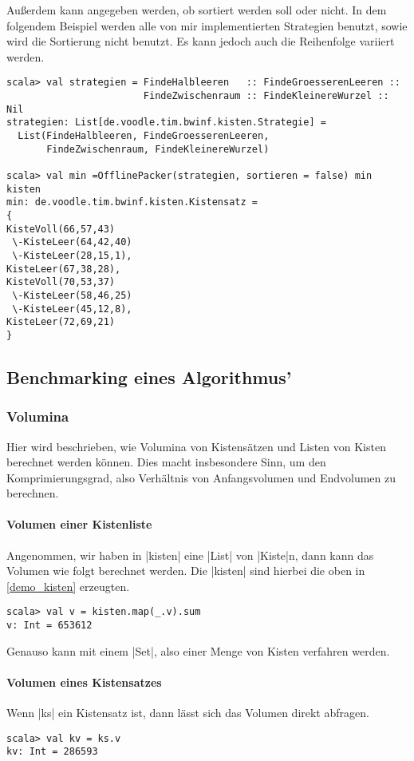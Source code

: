 Außerdem kann angegeben werden, ob sortiert werden soll oder nicht.
In dem folgendem Beispiel werden alle von mir implementierten Strategien benutzt, sowie wird die Sortierung nicht benutzt.
Es kann jedoch auch die Reihenfolge variiert werden.
\begin{lstlisting}
scala> val strategien = FindeHalbleeren   :: FindeGroesserenLeeren ::
                        FindeZwischenraum :: FindeKleinereWurzel :: Nil
strategien: List[de.voodle.tim.bwinf.kisten.Strategie] =
  List(FindeHalbleeren, FindeGroesserenLeeren,
       FindeZwischenraum, FindeKleinereWurzel)

scala> val min =OfflinePacker(strategien, sortieren = false) min kisten
min: de.voodle.tim.bwinf.kisten.Kistensatz = 
{
KisteVoll(66,57,43)
 \-KisteLeer(64,42,40)
 \-KisteLeer(28,15,1),
KisteLeer(67,38,28),
KisteVoll(70,53,37)
 \-KisteLeer(58,46,25)
 \-KisteLeer(45,12,8),
KisteLeer(72,69,21)
}
\end{lstlisting}

\clearpage
\subsection{Benchmarking eines Algorithmus'}
\subsubsection{Volumina}
 Hier wird beschrieben, wie Volumina von Kistensätzen und Listen von Kisten berechnet werden können.
 Dies macht insbesondere Sinn, um den Komprimierungsgrad, also Verhältnis von Anfangsvolumen und Endvolumen zu berechnen.

\paragraph{Volumen einer Kistenliste}
 Angenommen, wir haben in |kisten| eine |List| von |Kiste|n, dann kann das Volumen wie folgt berechnet werden.
 Die |kisten| sind hierbei die oben in \ref{demo_kisten} erzeugten.
\begin{lstlisting}
scala> val v = kisten.map(_.v).sum
v: Int = 653612
\end{lstlisting}
 Genauso kann mit einem |Set|, also einer Menge von Kisten verfahren werden.
\paragraph{Volumen eines Kistensatzes}
 Wenn |ks| ein Kistensatz ist, dann lässt sich das Volumen direkt abfragen.
\begin{lstlisting}
scala> val kv = ks.v
kv: Int = 286593
\end{lstlisting}
